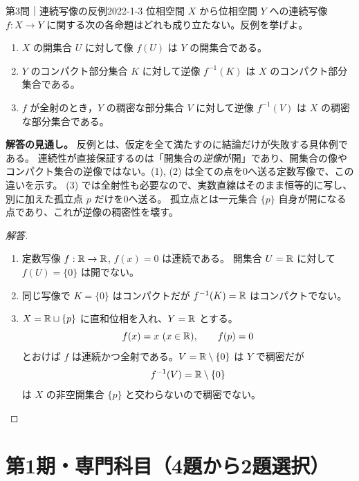 \begin{problem}{第3問｜連続写像の反例}{2022-1-3}
位相空間 $X$ から位相空間 $Y$ への連続写像 $f:X\to Y$ に関する次の各命題はどれも成り立たない。反例を挙げよ。
\begin{enumerate}
  \item[(1)] $X$ の開集合 $U$ に対して像 $f(U)$ は $Y$ の開集合である。
  \item[(2)] $Y$ のコンパクト部分集合 $K$ に対して逆像 $f^{-1}(K)$ は $X$ のコンパクト部分集合である。
  \item[(3)] $f$ が全射のとき，$Y$ の稠密な部分集合 $V$ に対して逆像 $f^{-1}(V)$ は $X$ の稠密な部分集合である。
\end{enumerate}
\end{problem}
\begin{memo*}
\textbf{解答の見通し。}
反例とは、仮定を全て満たすのに結論だけが失敗する具体例である。
連続性が直接保証するのは「開集合の\emph{逆像}が開」であり、開集合の像や
コンパクト集合の逆像ではない。(1), (2) は全ての点を0へ送る定数写像で、この違いを示す。
(3) では全射性も必要なので、実数直線はそのまま恒等的に写し、別に加えた孤立点 $p$ だけを0へ送る。
孤立点とは一元集合 $\{p\}$ 自身が開になる点であり、これが逆像の稠密性を壊す。
\end{memo*}
\begin{proof}[解答]
\begin{enumerate}
  \item[(1)] 定数写像 $f:\mathbb{R}\to\mathbb{R}$, $f(x)=0$ は連続である。
  開集合 $U=\mathbb{R}$ に対して $f(U)=\{0\}$ は開でない。

  \item[(2)] 同じ写像で $K=\{0\}$ はコンパクトだが
  $f^{-1}(K)=\mathbb{R}$ はコンパクトでない。

  \item[(3)] $X=\mathbb{R}\sqcup\{p\}$ に直和位相を入れ、$Y=\mathbb{R}$ とする。
  \[
  f(x)=x\ (x\in\mathbb{R}),\qquad f(p)=0
  \]
  とおけば $f$ は連続かつ全射である。$V=\mathbb{R}\setminus\{0\}$ は $Y$ で稠密だが
  \[
  f^{-1}(V)=\mathbb{R}\setminus\{0\}
  \]
  は $X$ の非空開集合 $\{p\}$ と交わらないので稠密でない。
\end{enumerate}
\end{proof}

\section{第1期・専門科目（4題から2題選択）}

